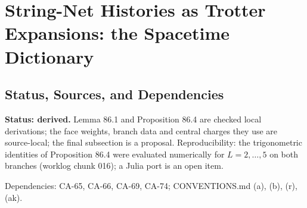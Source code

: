 
\section{String-Net Histories as Trotter Expansions: the Spacetime Dictionary}
\label{sec:spacetime-trotter-dictionary}

\subsection{Status, Sources, and Dependencies}

\textbf{Status: derived.}  Lemma 86.1 and
Proposition 86.4 are checked local derivations; the face
weights, branch data and central charges they use are source-local; the
final subsection is a proposal.  Reproducibility: the trigonometric identities
of Proposition 86.4 were evaluated numerically for
\(L=2,\dots,5\) on both branches (worklog chunk 016); a Julia port is an
open item.

Dependencies: CA-65, CA-66, CA-69, CA-74; CONVENTIONS.md (a), (b), (r), (ak).

